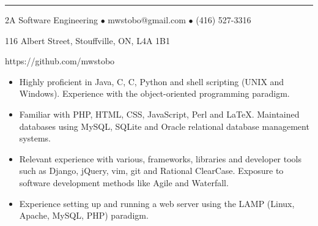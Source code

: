 \documentclass[10pt,letterpaper]{article}
\newcommand{\CPP}
{C\nolinebreak[4]\hspace{-.05em}\raisebox{.22ex}{\footnotesize\bf ++}}
\begin{document}
\vspace{0.8em}
\hrule
\vspace{0.4em}


\hfill 2A Software Engineering $\bullet$ 
mwstobo@gmail.com $\bullet$ (416) 527-3316

\hfill116 Albert Street, Stouffville, ON, L4A 1B1

\hfill https://github.com/mwstobo

\smallskip

\raggedright

\begin{itemize}
\parskip=0.1em
\item Highly proficient in Java, \CPP, C, Python and shell scripting (UNIX and Windows).  Experience with the object-oriented programming paradigm.
\item Familiar with PHP, HTML, CSS, JavaScript, Perl and \LaTeX.  Maintained databases using MySQL, SQLite and Oracle relational database management systems.
\item Relevant experience with various, frameworks, libraries and developer tools such as Django, jQuery, vim, git and Rational ClearCase.  Exposure to software development methods like Agile and Waterfall.
\item Experience setting up and running a web server using the LAMP (Linux, Apache, MySQL, PHP) paradigm.
\end{itemize}
\end{document}
